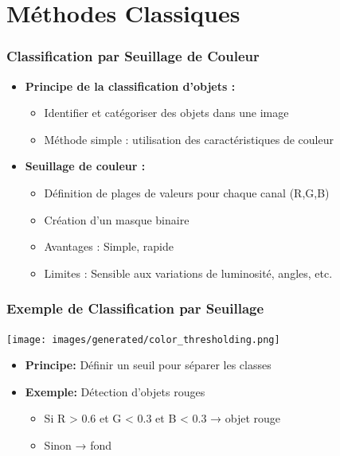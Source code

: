 \documentclass{beamer}
\begin{document}
\section{Méthodes Classiques}

\begin{frame}
    \frametitle{Classification par Seuillage de Couleur}
    \begin{itemize}
        \item \textbf{Principe de la classification d'objets :}
        \begin{itemize}
            \item Identifier et catégoriser des objets dans une image
            \item Méthode simple : utilisation des caractéristiques de couleur
        \end{itemize}
        \item \textbf{Seuillage de couleur :}
        \begin{itemize}
            \item Définition de plages de valeurs pour chaque canal (R,G,B)
            \item Création d'un masque binaire
            \item Avantages : Simple, rapide
            \item Limites : Sensible aux variations de luminosité, angles, etc.
        \end{itemize}
    \end{itemize}
\end{frame}

\begin{frame}
    \frametitle{Exemple de Classification par Seuillage}
    \begin{center}
        \texttt{[image: images/generated/color\_thresholding.png]}
    \end{center}
    \begin{itemize}
        \item \textbf{Principe:} Définir un seuil pour séparer les classes
        \item \textbf{Exemple:} Détection d'objets rouges
        \begin{itemize}
            \item Si R > 0.6 et G < 0.3 et B < 0.3 → objet rouge
            \item Sinon → fond
        \end{itemize}
    \end{itemize}
\end{frame}
\end{document}
